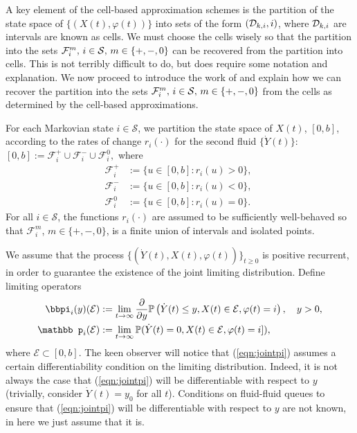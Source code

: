 A key element of the cell-based approximation schemes is the partition of the state space of \(\{(X(t),\varphi(t))\}\) into sets of the form \((\mathcal{D}_{k,i},i)\), where \(\mathcal{D}_{k,i}\) are intervals are known as cells. We must choose the cells wisely so that the partition into the sets \(\mathcal F_i^m,\, i\in\mathcal{S},\,m\in\{+,-,0\}\) can be recovered from the partition into cells. This is not terribly difficult to do, but does require some notation and explanation. We now proceed to introduce the work of \cite{bo2014} and explain how we can recover the partition into the sets \(\mathcal F_i^m,\, i\in\mathcal{S},\,m\in\{+,-,0\}\) from the cells as determined by the cell-based approximations.

For each Markovian state $i \in \mathcal{S}$, we partition the state space of \( X(t)\), \([0,b]\), according to the rates of change $r_i(\cdot)$ for the second fluid $\{\dot Y(t)\}$: $[0,b] := \mathcal{F}^{+}_i \cup \mathcal{F}^{-}_i \cup \mathcal{F}^{0}_i,$  
where 
% 
		\begin{align} 
			\mathcal{F}^{+}_i & := \{u \in [0,b] : r_i(u) > 0\},  \; \nonumber
			\\\mathcal{F}^{-}_i &:=  \{u \in [0,b]:  r_i(u) < 0\}, \; \nonumber
			\\\mathcal{F}^{0}_i &:= \{u \in [0,b]: r_i(u) = 0\}.\label{eqn:fil}
		\end{align} 
% 
For all $i \in \mathcal{S}$, the functions $r_i(\cdot)$ are assumed to be sufficiently well-behaved so that $\mathcal{F}^{m}_i$, $m \in \{+, -, 0\}$, is a finite union of intervals and isolated points. 

We assume that the process $\{(\dot Y(t), X(t), \varphi(t))\}_{t\geq 0}$ is positive recurrent, in order to guarantee the existence of the joint limiting distribution. Define limiting operators 
\begin{align} 
		\label{eqn:jointpi} 
		\bbpi_i(y)(\mathcal{E}) & := \lim_{t \rightarrow \infty} \frac{\partial}{\partial y} \mathbb{P}\left( \dot Y(t) \leq y,  X(t) \in \mathcal{E}, \varphi(t) = i\right), \quad y>0,\\
% 
		\label{eqn:jointmass}
		{\mathbb p}_i(\mathcal{E}) & := \lim_{t \rightarrow \infty}  \mathbb{P}( \dot Y(t) = 0,  X(t) \in \mathcal{E}, \varphi(t) = i]),
\end{align} 
where $\mathcal{E} \subset [0,b]$. The keen observer will notice that (\ref{eqn:jointpi}) assumes a certain differentiability condition on the limiting distribution. Indeed, it is not always the case that (\ref{eqn:jointpi}) will be differentiable with respect to \(y\) (trivially, consider \(\dot Y(t)=y_0\) for all \(t\)). Conditions on fluid-fluid queues to ensure that (\ref{eqn:jointpi}) will be differentiable with respect to \(y\) are not known, in here we just assume that it is. 

